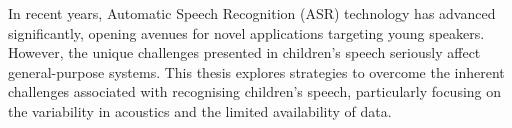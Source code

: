 




\noindent In recent years, Automatic Speech Recognition (ASR) technology has advanced significantly, opening avenues for novel applications targeting young speakers. However, the unique challenges presented in children’s speech seriously affect general-purpose systems. This thesis explores strategies to overcome the inherent challenges associated with recognising children's speech, particularly focusing on the variability in acoustics and the limited availability of data. 

